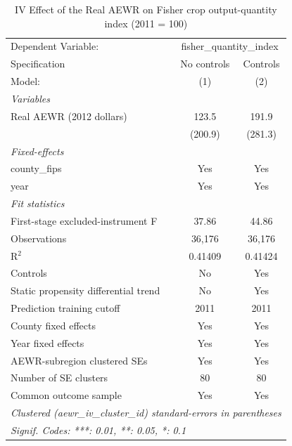 
\begin{table}[htbp]
   \caption{\label{tab:iv_output_quantities} IV Effect of the Real AEWR on Fisher crop output-quantity index (2011 = 100)}
   \centering
   \begin{tabular}{lcc}
      \tabularnewline \midrule \midrule
      Dependent Variable: & \multicolumn{2}{c}{fisher\_quantity\_index}\\
      Specification                        & No controls & Controls \\
      Model:                               & (1)         & (2)\\
      \midrule
      \emph{Variables}\\
      Real AEWR (2012 dollars)             & 123.5       & 191.9\\
                                           & (200.9)     & (281.3)\\
      \midrule
      \emph{Fixed-effects}\\
      county\_fips                         & Yes         & Yes\\
      year                                 & Yes         & Yes\\
      \midrule
      \emph{Fit statistics}\\
      First-stage excluded-instrument F    & 37.86       & 44.86\\
      Observations                         & 36,176      & 36,176\\
      R$^2$                                & 0.41409     & 0.41424\\
      Controls                             & No          & Yes\\
      Static propensity differential trend & No          & Yes\\
      Prediction training cutoff           & 2011        & 2011\\
      County fixed effects                 & Yes         & Yes\\
      Year fixed effects                   & Yes         & Yes\\
      AEWR-subregion clustered SEs         & Yes         & Yes\\
      Number of SE clusters                & 80          & 80\\
      Common outcome sample                & Yes         & Yes\\
      \midrule \midrule
      \multicolumn{3}{l}{\emph{Clustered (aewr\_iv\_cluster\_id) standard-errors in parentheses}}\\
      \multicolumn{3}{l}{\emph{Signif. Codes: ***: 0.01, **: 0.05, *: 0.1}}\\
   \end{tabular}


\end{table}
